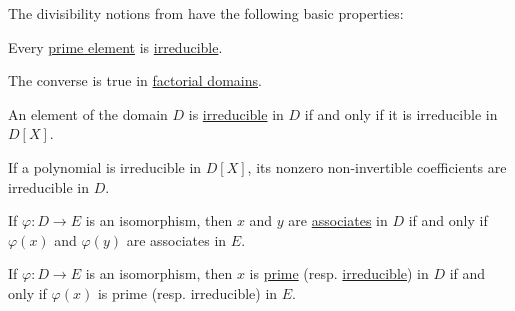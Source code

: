 \begin{proposition}\label{thm:def:domain_divisibility}
  The divisibility notions from  have the following basic properties:
  \begin{thmenum}
     Every \hyperref[def:domain_divisibility/prime]{prime element} is \hyperref[def:domain_divisibility/irreducible]{irreducible}.

    The converse is true in \hyperref[def:factorial_domain]{factorial domains}.

     An element of the domain \( D \) is \hyperref[def:domain_divisibility/irreducible]{irreducible} in \( D \) if and only if it is irreducible in \( D[X] \).

     If a polynomial is irreducible in \( D[X] \), its nonzero non-invertible coefficients are irreducible in \( D \).

     If \( \varphi: D \to E \) is an isomorphism, then \( x \) and \( y \) are \hyperref[def:domain_divisibility/associates]{associates} in \( D \) if and only if \( \varphi(x) \) and \( \varphi(y) \) are associates in \( E \).

     If \( \varphi: D \to E \) is an isomorphism, then \( x \) is \hyperref[def:domain_divisibility/prime]{prime} (resp. \hyperref[def:domain_divisibility/irreducible]{irreducible}) in \( D \) if and only if \( \varphi(x) \) is prime (resp. irreducible) in \( E \).
  \end{thmenum}
\end{proposition}
